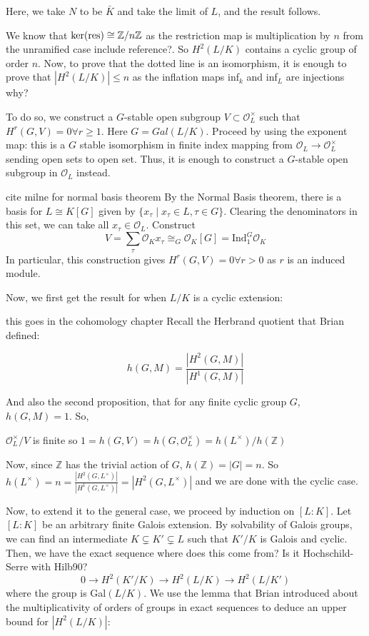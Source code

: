 \documentclass[class=article, crop=false]{standalone}
\begin{document}
Here, we take $N$ to be $\bar{K}$ and take the limit of $L$, and the result follows. 

We know that \(\ker(\text{res}) \cong \mathbb{Z} / n\mathbb{Z}\) 
as the restriction map is multiplication by \(n\) from the
unramified case {\color{red} include reference?}.
So $H^2(L/K)$ contains a cyclic group of order $n$.
Now, to prove that the dotted line is an isomorphism, 
it is enough to prove that 
$|H^2(L/K)|\leq n$ as the inflation maps 
inf$_k$ and inf$_L$ are injections {\color{red} why?}

To do so, we construct a $G$-stable open subgroup $V\subset \mathcal{O}_L^\times$ such that $H^r(G, V)=0\forall r\geq 1$. Here $G=Gal(L/K).$ Proceed by using the exponent map: this is a $G$ stable isomorphism in finite index mapping from $\mathcal{O}_L\rightarrow\mathcal{O}_L^\times$ sending open sets to open set. Thus, it is enough to construct a $G$-stable open subgroup in $\mathcal{O}_L$ instead. 

{\color{red} cite milne for normal basis theorem}
By the Normal Basis theorem, there is a basis for $L\cong K[G]$ given by $\{x_\tau \mid x_\tau\in L, \tau\in G\}$. Clearing the denominators in this set, we can take all $x_\tau\in \mathcal{O}_L$. Construct $$V=\sum_\tau \mathcal{O}_Kx_\tau\cong_G\mathcal{O}_K[G]=\text{Ind}_1^G\mathcal{O}_K$$ 
In particular, this construction gives $H^r(G,V)=0\forall r>0$ as $r$ is an induced module. 

Now, we first get the result for when $L/K$ is a cyclic extension: 

{\color{red} this goes in the cohomology chapter}
Recall the Herbrand quotient that Brian defined:

$$h(G,M)=\frac{|H^2(G,M)|}{|H^1(G,M)|}$$

And also the second proposition, that for any finite cyclic group $G$, $h(G,M)=1$. So,

$\mathcal{O}_L^\times/V$ is finite so $1=h(G, V)=h(G, \mathcal{O}_L^\times)=h(L^\times)/h(\mathbb{Z})$

Now, since $\mathbb{Z}$ has the trivial action of $G$, $h(\mathbb{Z})=|G|=n$. So $h(L^\times)=n=\frac{|H^2(G,L^\times)|}{|H^1(G,L^\times)|}=|H^2(G,L^\times)|$ and we are done with the cyclic case. 

Now, to extend it to the general case, we proceed by induction on $[L:K]$. Let $[L:K]$ be an arbitrary finite Galois extension. By solvability of Galois groups, we can find an intermediate $K\subsetneq K'\subsetneq L$ such that $K'/K$ is Galois and cyclic. 
Then, we have the exact sequence 
{\color{red} where does this come from? 
Is it Hochschild-Serre with Hilb90?}
$$0\rightarrow H^2(K'/K)\rightarrow H^2(L/K)\rightarrow H^2(L/K')$$ 
where the group is Gal$(L/K)$. We use the lemma that Brian introduced about the multiplicativity of orders of groups in exact sequences to deduce an upper bound for $|H^2(L/K)|:$
\end{document}
